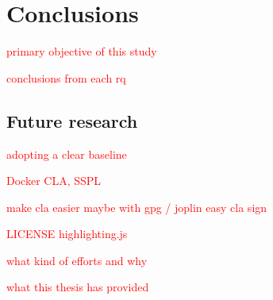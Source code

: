 \chapter{Conclusions\label{conclusions}}
\textcolor{red}{primary objective of this study}

\textcolor{red}{conclusions from each rq}


\section{Future research}
\textcolor{red}{adopting a clear baseline}

\textcolor{red}{Docker CLA, SSPL}

\textcolor{red}{make cla easier maybe with gpg / joplin easy cla sign}

\textcolor{red}{LICENSE highlighting.js}

\textcolor{red}{what kind of efforts and why}

\textcolor{red}{what this thesis has provided}